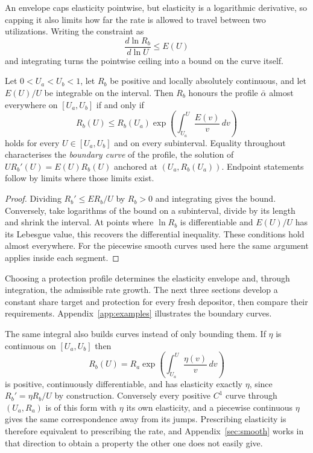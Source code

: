 \documentclass[11pt,a4paper]{article}
\begin{document}
An envelope caps elasticity pointwise, but elasticity is a logarithmic derivative, so capping it also limits how far the rate is allowed to travel between two utilizations. Writing the constraint as
\[
\frac{d\ln R_b}{d\ln U}\leq E(U)
\]
and integrating turns the pointwise ceiling into a bound on the curve itself.

\begin{theorem}
\label{thm:family}
Let $0<U_a<U_b<1$, let $R_b$ be positive and locally absolutely continuous, and let $E(U)/U$ be integrable on the interval. Then $R_b$ honours the profile $\bar\alpha$ almost everywhere on $[U_a,U_b]$ if and only if
\[
\boxed{
R_b(U)\leq R_b(U_a)\exp\left(\int_{U_a}^{U}\frac{E(v)}{v}\,dv\right)
}
\]
holds for every $U\in[U_a,U_b]$ and on every subinterval. Equality throughout characterises the \emph{boundary curve} of the profile, the solution of $UR_b'(U)=E(U)R_b(U)$ anchored at $(U_a,R_b(U_a))$. Endpoint statements follow by limits where those limits exist.
\end{theorem}
\begin{proof}
Dividing $R_b'\leq ER_b/U$ by $R_b>0$ and integrating gives the bound. Conversely, take logarithms of the bound on a subinterval, divide by its length and shrink the interval. At points where $\ln R_b$ is differentiable and $E(U)/U$ has its Lebesgue value, this recovers the differential inequality. These conditions hold almost everywhere. For the piecewise smooth curves used here the same argument applies inside each segment.
\end{proof}

Choosing a protection profile determines the elasticity envelope and, through integration, the admissible rate growth. The next three sections develop a constant share target and protection for every fresh depositor, then compare their requirements. Appendix~\ref{app:examples} illustrates the boundary curves.

The same integral also builds curves instead of only bounding them. If $\eta$ is continuous on $[U_a,U_b]$ then
\[
R_b(U)=R_a\exp\left(\int_{U_a}^{U}\frac{\eta(v)}{v}\,dv\right)
\]
is positive, continuously differentiable, and has elasticity exactly $\eta$, since $R_b'=\eta R_b/U$ by construction. Conversely every positive $C^1$ curve through $(U_a,R_a)$ is of this form with $\eta$ its own elasticity, and a piecewise continuous $\eta$ gives the same correspondence away from its jumps. Prescribing elasticity is therefore equivalent to prescribing the rate, and Appendix~\ref{sec:smooth} works in that direction to obtain a property the other one does not easily give.
\end{document}
